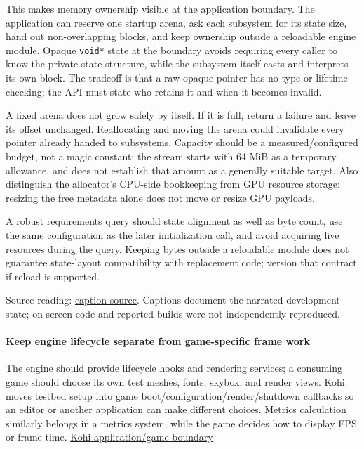 This makes memory ownership visible at the application boundary. The application can reserve one startup arena, ask each subsystem for its state size, hand out non-overlapping blocks, and keep ownership outside a reloadable engine module. Opaque \texttt{void*} state at the boundary avoids requiring every caller to know the private state structure, while the subsystem itself casts and interprets its own block. The tradeoff is that a raw opaque pointer has no type or lifetime checking; the API must state who retains it and when it becomes invalid.

A fixed arena does not grow safely by itself. If it is full, return a failure and leave its offset unchanged. Reallocating and moving the arena could invalidate every pointer already handed to subsystems. Capacity should be a measured/configured budget, not a magic constant: the stream starts with 64 MiB as a temporary allowance, and does not establish that amount as a generally suitable target. Also distinguish the allocator's CPU-side bookkeeping from GPU resource storage: resizing the free metadata alone does not move or resize GPU payloads.

A robust requirements query should state alignment as well as byte count, use the same configuration as the later initialization call, and avoid acquiring live resources during the query. Keeping bytes outside a reloadable module does not guarantee state-layout compatibility with replacement code; version that contract if reload is supported.

Source reading: \href{https://www.youtube.com/watch?v=3ZFcvBjRFN0}{caption source}. Captions document the narrated development state; on-screen code and reported builds were not independently reproduced.

\paragraph{Keep engine lifecycle separate from game-specific frame work}\label{keep-engine-lifecycle-separate-from-game-specific-frame-work}

The engine should provide lifecycle hooks and rendering services; a consuming game should choose its own test meshes, fonts, skybox, and render views. Kohi moves testbed setup into game boot/configuration/render/shutdown callbacks so an editor or another application can make different choices. Metrics calculation similarly belongs in a metrics system, while the game decides how to display FPS or frame time. \href{https://www.youtube.com/watch?v=UWaUUhOFCec}{Kohi application/game boundary}


